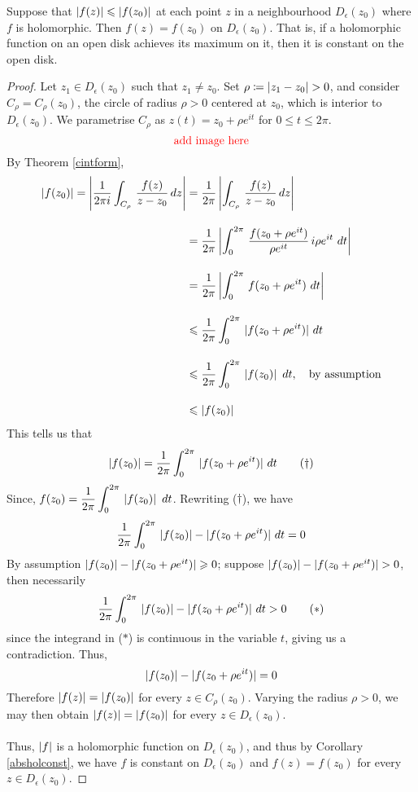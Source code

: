 \medskip

\begin{lemma}
Suppose that $\left\lvert f(z)\right\rvert \leqslant \left\lvert f(z_0)\right\rvert$ at each point $z$ in a neighbourhood $D_\epsilon(z_0)$ where $f$ is holomorphic. Then $f(z) = f(z_0)$ on $D_\epsilon(z_0)$. That is, if a holomorphic function on an open disk achieves its maximum on it, then it is constant on the open disk.
\end{lemma}
\begin{proof}
Let $z_1 \in D_\epsilon(z_0)$ such that $z_1 \neq z_0$. Set $\rho \coloneqq \left\lvert z_1 - z_0\right\rvert > 0$, and consider $C_\rho = C_\rho(z_0)$, the circle of radius $\rho > 0$ centered at $z_0$, which is interior to $D_\epsilon(z_0)$. We parametrise $C_\rho$ as $z(t) = z_0 + \rho e^{it}$ for $0 \leq t \leq 2\pi$.
\[
\text{\color{red}add image here}
\]
By Theorem \ref{cintform},
\begin{align*}
\left\lvert f(z_0)\right\rvert = \left\lvert\frac{1}{2\pi i}\int_{C_\rho}\,\frac{f(z)}{z - z_0}\, dz\right\rvert &= \frac{1}{2\pi}\left\lvert\int_{C_\rho}\,\frac{f(z)}{z - z_0}\, dz\right\rvert\\[1em]
 &= \frac{1}{2\pi}\left\lvert\int_0^{2\pi}\,\frac{f(z_0 + \rho e^{it})}{\rho e^{it}}\,i\rho e^{it}\ dt\right\rvert\\[1em]
 &= \frac{1}{2\pi}\left\lvert\int_0^{2\pi}\,f(z_0 + \rho e^{it})\ dt\right\rvert\\[1em]
 &\leqslant \frac{1}{2\pi}\int_0^{2\pi}\,|f(z_0 + \rho e^{it})|\ dt\\[1em]
 &\leqslant \frac{1}{2\pi}\int_0^{2\pi}\,\left\lvert f(z_0)\right\rvert\ dt,\quad \text{by assumption}\\[1em]
 &\leqslant \left\lvert f(z_0)\right\rvert
\end{align*} 
This tells us that
\[\left\lvert f(z_0)\right\rvert = \frac{1}{2\pi}\int_0^{2\pi}\,|f(z_0 + \rho e^{it})|\ dt \tag{$\dagger$}\]
Since, $\displaystyle f(z_0) =  \frac{1}{2\pi}\int_0^{2\pi}\,\left\lvert f(z_0)\right\rvert\ dt$. Rewriting ($\dagger$), we have
\[\frac{1}{2\pi}\int_0^{2\pi}\, \left\lvert f(z_0)\right\rvert - |f(z_0 + \rho e^{it})|\ dt = 0\]
By assumption $\left\lvert f(z_0)\right\rvert - |f(z_0 + \rho e^{it})| \geqslant 0$; suppose $\left\lvert f(z_0)\right\rvert - |f(z_0 + \rho e^{it})| > 0$, then necessarily 
\[\frac{1}{2\pi}\int_0^{2\pi}\, \left\lvert f(z_0)\right\rvert - |f(z_0 + \rho e^{it})|\ dt > 0\tag{$*$}\]
since the integrand in ($*$) is continuous in the variable $t$, giving us a contradiction. Thus, 
\[\left\lvert f(z_0)\right\rvert - |f(z_0 + \rho e^{it})| = 0\]
Therefore $\left\lvert f(z)\right\rvert = \left\lvert f(z_0)\right\rvert$ for every $z \in C_\rho(z_0)$. Varying the radius $\rho > 0$, we may then obtain $\left\lvert f(z)\right\rvert = \left\lvert f(z_0)\right\rvert$ for every $z \in D_\epsilon(z_0)$.\\
\\
Thus, $\left\lvert f\right\rvert$ is a holomorphic function on $D_\epsilon(z_0)$, and thus by Corollary \ref{absholconst}, we have $f$ is constant on $D_\epsilon(z_0)$ and $f(z) = f(z_0)$ for every $z \in D_\epsilon(z_0)$.
\end{proof}